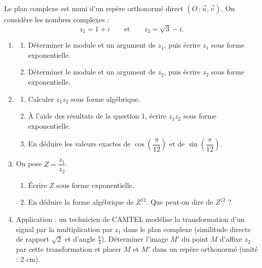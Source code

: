 \documentclass[11pt]{article}
\begin{document}
\begin{exercice}
Le plan complexe est muni d'un repère orthonormé direct $(O\,;\vec{u},\vec{v})$. On considère les nombres complexes :
\[ z_1 = 1 + i \qquad \text{et} \qquad z_2 = \sqrt{3} - i. \]
\begin{enumerate}
\item \begin{enumerate}
\item Déterminer le module et un argument de $z_1$, puis écrire $z_1$ sous forme exponentielle.
\item Déterminer le module et un argument de $z_2$, puis écrire $z_2$ sous forme exponentielle.
\end{enumerate}
\item \begin{enumerate}
\item Calculer $z_1 z_2$ sous forme algébrique.
\item À l'aide des résultats de la question 1, écrire $z_1 z_2$ sous forme exponentielle.
\item En déduire les valeurs exactes de $\cos\left(\dfrac{\pi}{12}\right)$ et de $\sin\left(\dfrac{\pi}{12}\right)$.
\end{enumerate}
\item On pose $Z = \dfrac{z_1}{z_2}$.
\begin{enumerate}
\item Écrire $Z$ sous forme exponentielle.
\item En déduire la forme algébrique de $Z^{12}$. Que peut-on dire de $Z^{12}$ ?
\end{enumerate}
\item Application : un technicien de CAMTEL modélise la transformation d'un signal par la multiplication par $z_1$ dans le plan complexe (similitude directe de rapport $\sqrt{2}$ et d'angle $\frac{\pi}{4}$). Déterminer l'image $M'$ du point $M$ d'affixe $z_2$ par cette transformation et placer $M$ et $M'$ dans un repère orthonormé (unité : 2 cm).
\end{enumerate}
\end{exercice}
\end{document}
